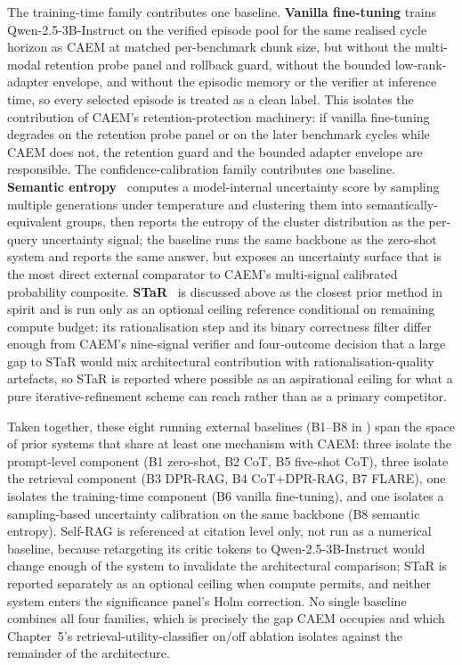 The training-time family contributes one baseline. \textbf{Vanilla fine-tuning} trains Qwen-2.5-3B-Instruct on the verified episode pool for the same realised cycle horizon as CAEM at matched per-benchmark chunk size, but without the multi-modal retention probe panel and rollback guard, without the bounded low-rank-adapter envelope, and without the episodic memory or the verifier at inference time, so every selected episode is treated as a clean label. This isolates the contribution of CAEM's retention-protection machinery: if vanilla fine-tuning degrades on the retention probe panel or on the later benchmark cycles while CAEM does not, the retention guard and the bounded adapter envelope are responsible. The confidence-calibration family contributes one baseline. \textbf{Semantic entropy}~\cite{farquhar2024semantic} computes a model-internal uncertainty score by sampling multiple generations under temperature and clustering them into semantically-equivalent groups, then reports the entropy of the cluster distribution as the per-query uncertainty signal; the baseline runs the same backbone as the zero-shot system and reports the same answer, but exposes an uncertainty surface that is the most direct external comparator to CAEM's multi-signal calibrated probability composite. \textbf{STaR}~\cite{NEURIPS2022_639a9a17} is discussed above as the closest prior method in spirit and is run only as an optional ceiling reference conditional on remaining compute budget: its rationalisation step and its binary correctness filter differ enough from CAEM's nine-signal verifier and four-outcome decision that a large gap to STaR would mix architectural contribution with rationalisation-quality artefacts, so STaR is reported where possible as an aspirational ceiling for what a pure iterative-refinement scheme can reach rather than as a primary competitor.

Taken together, these eight running external baselines (B1--B8 in ) span the space of prior systems that share at least one mechanism with CAEM: three isolate the prompt-level component (B1 zero-shot, B2 CoT, B5 five-shot CoT), three isolate the retrieval component (B3 DPR-RAG, B4 CoT$+$DPR-RAG, B7 FLARE), one isolates the training-time component (B6 vanilla fine-tuning), and one isolates a sampling-based uncertainty calibration on the same backbone (B8 semantic entropy). Self-RAG is referenced at citation level only, not run as a numerical baseline, because retargeting its critic tokens to Qwen-2.5-3B-Instruct would change enough of the system to invalidate the architectural comparison; STaR is reported separately as an optional ceiling when compute permits, and neither system enters the significance panel's Holm correction. No single baseline combines all four families, which is precisely the gap CAEM occupies and which Chapter~5's retrieval-utility-classifier on/off ablation isolates against the remainder of the architecture.

